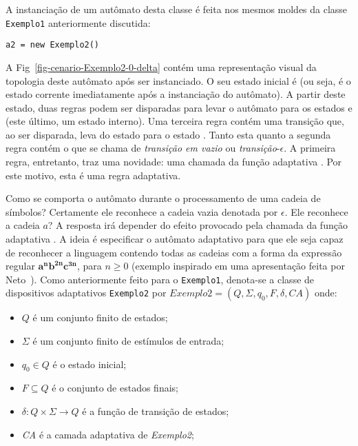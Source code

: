 \noindent
A instanciação de um autômato desta classe é feita nos mesmos moldes da classe \lstinline|Exemplo1| anteriormente discutida:

\begin{lstlisting}
a2 = new Exemplo2()
\end{lstlisting}

\noindent
A Fig~\ref{fig-cenario-Exemplo2-0-delta} contém uma representação visual da topologia deste autômato após ser instanciado. O seu estado inicial é  (ou seja, é o estado corrente imediatamente após a instanciação do autômato). A partir deste estado, duas regras podem ser disparadas para levar o autômato para os estados  e  (este último, um estado interno). Uma terceira regra contém uma transição que, ao ser disparada, leva  do estado  para o estado . Tanto esta quanto a segunda regra contém o que se chama de \textit{transição em vazio} ou \textit{transição}-$\epsilon$. A primeira regra, entretanto, traz uma novidade: uma chamada da função adaptativa . Por este motivo, esta é uma regra adaptativa.


Como se comporta o autômato  durante o processamento de uma cadeia de símbolos? Certamente ele reconhece a cadeia vazia denotada por $\epsilon$. Ele reconhece a cadeia $a$? A resposta irá depender do efeito provocado pela chamada da função adaptativa . A ideia é especificar o autômato adaptativo para que ele seja capaz de reconhecer a linguagem contendo todas as cadeias com a forma da expressão regular $\mathbf{a^nb^{2n}c^{3n}}$, para $n \geq 0$ (exemplo inspirado em uma apresentação feita por Neto~\cite{neto:2008}). Como anteriormente feito para o \lstinline|Exemplo1|, denota-se a classe de dispositivos adaptativos \lstinline|Exemplo2| por $\textit{Exemplo2}=(Q, \Sigma, q_0, F, \delta, \textit{CA})$ onde:

\begin{itemize}
\item $Q$ é um conjunto finito de estados;
\item $\Sigma$ é um conjunto finito de estímulos de entrada;
\item $q_0 \in Q$ é o estado inicial;
\item $F\subseteq Q$ é o conjunto de estados finais;
\item $\delta:Q\times\Sigma \rightarrow Q$ é a função de transição de estados;
\item \textit{CA} é a camada adaptativa de \textit{Exemplo2};
\end{itemize}


